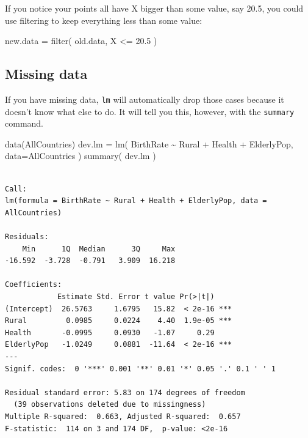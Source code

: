 \documentclass[
  letterpaper,
  DIV=11,
  numbers=noendperiod]{scrreprt}
\newenvironment{Shaded}{\begin{snugshade}}{\end{snugshade}}
\newcommand{\AttributeTok}[1]{\textcolor[rgb]{0.49,0.56,0.16}{#1}}
\newcommand{\FloatTok}[1]{\textcolor[rgb]{0.25,0.63,0.44}{#1}}
\newcommand{\FunctionTok}[1]{\textcolor[rgb]{0.02,0.16,0.49}{#1}}
\newcommand{\NormalTok}[1]{\textcolor[rgb]{0.00,0.44,0.13}{#1}}
\newcommand{\OtherTok}[1]{\textcolor[rgb]{0.00,0.44,0.13}{#1}}
\newcommand{\SpecialCharTok}[1]{\textcolor[rgb]{0.25,0.44,0.63}{#1}}
\begin{document}
If you notice your points all have X bigger than some value, say 20.5,
you could use filtering to keep everything less than some value:

\begin{Shaded}
\begin{Highlighting}[]
\NormalTok{new.data }\OtherTok{=} \FunctionTok{filter}\NormalTok{( old.data, X }\SpecialCharTok{\textless{}=} \FloatTok{20.5}\NormalTok{ )}
\end{Highlighting}
\end{Shaded}

\hypertarget{missing-data}{%
\subsection{Missing data}\label{missing-data}}

If you have missing data, \texttt{lm} will automatically drop those
cases because it doesn't know what else to do. It will tell you this,
however, with the \texttt{summary} command.

\begin{Shaded}
\begin{Highlighting}[]
\FunctionTok{data}\NormalTok{(AllCountries)}
\NormalTok{dev.lm }\OtherTok{=} \FunctionTok{lm}\NormalTok{( BirthRate }\SpecialCharTok{\textasciitilde{}}\NormalTok{ Rural }\SpecialCharTok{+}\NormalTok{ Health }\SpecialCharTok{+}\NormalTok{ ElderlyPop, }\AttributeTok{data=}\NormalTok{AllCountries )}
\FunctionTok{summary}\NormalTok{( dev.lm  )}
\end{Highlighting}
\end{Shaded}

\begin{verbatim}

Call:
lm(formula = BirthRate ~ Rural + Health + ElderlyPop, data = AllCountries)

Residuals:
    Min      1Q  Median      3Q     Max 
-16.592  -3.728  -0.791   3.909  16.218 

Coefficients:
            Estimate Std. Error t value Pr(>|t|)    
(Intercept)  26.5763     1.6795   15.82  < 2e-16 ***
Rural         0.0985     0.0224    4.40  1.9e-05 ***
Health       -0.0995     0.0930   -1.07     0.29    
ElderlyPop   -1.0249     0.0881  -11.64  < 2e-16 ***
---
Signif. codes:  0 '***' 0.001 '**' 0.01 '*' 0.05 '.' 0.1 ' ' 1

Residual standard error: 5.83 on 174 degrees of freedom
  (39 observations deleted due to missingness)
Multiple R-squared:  0.663, Adjusted R-squared:  0.657 
F-statistic:  114 on 3 and 174 DF,  p-value: <2e-16
\end{verbatim}
\end{document}
